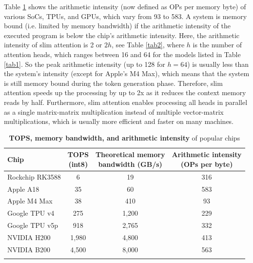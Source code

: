 \documentclass{article}
\def\fline{\Xhline{2\arrayrulewidth}} %
\begin{document}
Table \ref{tab3} shows the arithmetic intensity (now defined as OPs per memory byte) of various SoCs, TPUs, and GPUs, which vary from 93 to 583. A system is memory bound (i.e. limited by memory bandwidth) if the arithmetic intensity of the executed program is below the chip’s arithmetic intensity. Here, the arithmetic intensity of slim attention is 2 or $2h$, see Table \ref{tab2}, where $h$ is the number of attention heads, which ranges between 16 and 64 for the models listed in Table \ref{tab1}. So the peak arithmetic intensity (up to 128 for $h = 64$) is usually less than the system’s intensity (except for Apple's M4 Max), which means that the system is still memory bound during the token generation phase. Therefore, slim attention speeds up the processing by up to 2x as it reduces the context memory reads by half. Furthermore, slim attention enables processing all heads in parallel as a single matrix-matrix multiplication instead of multiple vector-matrix multiplications, which is usually more efficient and faster on many machines.
\begingroup \renewcommand{\arraystretch}{1.3} %
\begin{table}[h!] \centering
\caption{\textbf{TOPS, memory bandwidth, and arithmetic intensity} of popular chips}
\begin{tabular}{lccc} \fline
  Chip & \makecell{TOPS \\ (int8)} & \makecell{Theoretical memory \\ bandwidth (GB/s)} & \makecell{Arithmetic intensity \\ (OPs per byte)} \\ \hline
  Rockchip RK3588 & 6         & 19      & 316 \\
  Apple A18 \citep{apple-wiki}       & 35        & 60      & 583 \\
  Apple M4 Max \citep{apple-wiki}    & 38        & 410     & 93  \\
  Google TPU v4 \citep{TPU-wiki}  & 275       & 1,200   & 229 \\
  Google TPU v5p \citep{TPU-wiki}  & 918       & 2,765   & 332 \\
  NVIDIA H200  \citep{nvidia-wiki}   & 1,980     & 4,800   & 413 \\
  NVIDIA B200 \citep{nvidia-wiki}    & 4,500     & 8,000   & 563 \\ \fline
\end{tabular} \label{tab3} \end{table} \endgroup
\end{document}
